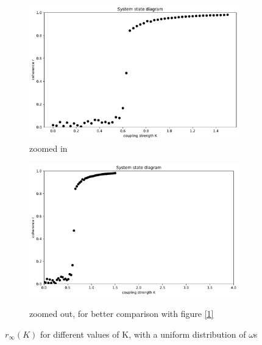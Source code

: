 \documentclass[11pt,a4paper]{article}
\begin{document}
\begin{figure}[h]
	\centering
	\begin{subfigure}{0.8\textwidth}
		\includegraphics[width = \textwidth]{graphics/3_K-vs-r_omegaDistr=uniform_zoomed_N=2000_1611568972.pdf}
		\caption{zoomed in}
		\label{3zoomedin}
	\end{subfigure}
	\begin{subfigure}{0.8\textwidth}
		\includegraphics[width = \textwidth]{graphics/3_K-vs-r_omegaDistr=uniform_N=2000_1611568972.pdf}
		\label{3zoomedout}
		\caption{zoomed out, for better comparison with figure \ref{1}}
	\end{subfigure}
	\caption{$r_\infty(K)$ for different values of K, with a uniform distribution of $\omega$s}
	\label{3}
\end{figure}
\end{document}
